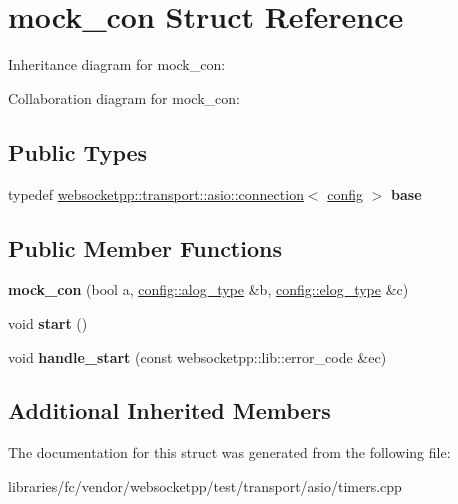\hypertarget{structmock__con}{}\section{mock\+\_\+con Struct Reference}
\label{structmock__con}


Inheritance diagram for mock\+\_\+con\+:


Collaboration diagram for mock\+\_\+con\+:
\subsection*{Public Types}
\begin{DoxyCompactItemize}
\item 
\mbox{\label{structmock__con_a7a1e76fdc7a1c373d9eda04c5e24e40a}} 
typedef \mbox{\hyperlink{classwebsocketpp_1_1transport_1_1asio_1_1connection}{websocketpp\+::transport\+::asio\+::connection}}$<$ \mbox{\hyperlink{classconfig}{config}} $>$ {\bfseries base}
\end{DoxyCompactItemize}
\subsection*{Public Member Functions}
\begin{DoxyCompactItemize}
\item 
\mbox{\label{structmock__con_a7492a7e931f3415ef6aec45655dc38a1}} 
{\bfseries mock\+\_\+con} (bool a, \mbox{\hyperlink{classwebsocketpp_1_1log_1_1stub}{config\+::alog\+\_\+type}} \&b, \mbox{\hyperlink{classwebsocketpp_1_1log_1_1stub}{config\+::elog\+\_\+type}} \&c)
\item 
\mbox{\label{structmock__con_a76adb10b2073f73cf11f310f113adf55}} 
void {\bfseries start} ()
\item 
\mbox{\label{structmock__con_a786e965628529c84c83de9db6700dd5f}} 
void {\bfseries handle\+\_\+start} (const websocketpp\+::lib\+::error\+\_\+code \&ec)
\end{DoxyCompactItemize}
\subsection*{Additional Inherited Members}


The documentation for this struct was generated from the following file\+:\begin{DoxyCompactItemize}
\item 
libraries/fc/vendor/websocketpp/test/transport/asio/timers.\+cpp\end{DoxyCompactItemize}
